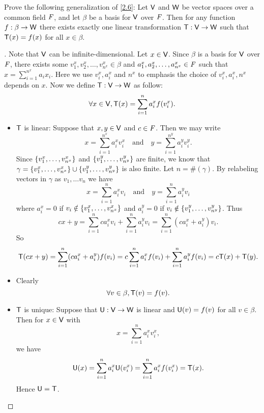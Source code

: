 \begin{ex}\label{ex:2.1.34}
  Prove the following generalization of \cref{2.6}:
  Let \(\mathsf{V}\) and \(\mathsf{W}\) be vector spaces over a common field \(\mathit{F}\), and let \(\beta\) be a basis for \(\mathsf{V}\) over \(\mathit{F}\).
  Then for any function \(f : \beta \to \mathsf{W}\) there exists exactly one linear transformation \(\mathsf{T} : \mathsf{V} \to \mathsf{W}\) such that \(\mathsf{T}(x) = f(x)\) for all \(x \in \beta\).
\end{ex}

\begin{proof}[]
  Note that \(\mathsf{V}\) can be infinite-dimensional.
  Let \(x \in \mathsf{V}\).
  Since \(\beta\) is a basis for \(\mathsf{V}\) over \(\mathit{F}\), there exists some \(v_1^x, v_2^x, \dots, v_{n^x}^x \in \beta\) and \(a_1^x, a_2^x, \dots, a_{n^x}^x \in \mathit{F}\) such that \(x = \sum_{i = 1}^{n^x} a_i x_i\).
  Here we use \(v_i^x, a_i^x\) and \(n^x\) to emphasis the choice of \(v_i^x, a_i^x, n^x\) depends on \(x\).
  Now we define \(\mathsf{T} : \mathsf{V} \to \mathsf{W}\) as follow:
  \[
    \forall x \in \mathsf{V}, \mathsf{T}(x) = \sum_{i = 1}^n a_i^x f(v_i^x).
  \]
  \begin{itemize}
    \item \(\mathsf{T}\) is linear:
          Suppose that \(x, y \in \mathsf{V}\) and \(c \in \mathit{F}\).
          Then we may write
          \[
            x = \sum_{i = 1}^{n^x} a_i^x v_i^x \quad \text{and} \quad y = \sum_{i = 1}^{n^y} a_i^y v_i^y.
          \]
          Since \(\left\lbrace v_1^x, \dots, v_{n^x}^x\right\rbrace\) and \(\left\lbrace v_1^y, \dots, v_{n^y}^y\right\rbrace\) are finite, we know that \(\gamma = \left\lbrace v_1^x, \dots, v_{n^x}^x\right\rbrace \cup \left\lbrace v_1^y, \dots, v_{n^y}^y\right\rbrace\) is also finite.
          Let \(n = \#(\gamma)\).
          By relabeling vectors in \(\gamma\) as \(v_1, \dots v_n\) we have
          \[
            x = \sum_{i = 1}^n a_i^x v_i \quad \text{and} \quad y = \sum_{i = 1}^n a_i^y v_i
          \]
          where \(a_i^x = 0\) if \(v_i \notin \left\lbrace v_1^x, \dots, v_{n^x}^x\right\rbrace\) and \(a_i^y = 0\) if \(v_i \notin \left\lbrace v_1^y, \dots, v_{n^y}^y\right\rbrace\).
          Thus
          \[
            cx + y = \sum_{i = 1}^n c a_i^x v_i + \sum_{i = 1}^n a_i^y v_i = \sum_{i = 1}^n (c a_i^x + a_i^y) v_i.
          \]
          So
          \[
            \mathsf{T}(cx + y) = \sum_{i = 1}^n (c a_i^x + a_i^y) f(v_i) = c \sum_{i = 1}^n a_i^x f(v_i) + \sum_{i = 1}^n a_i^y f(v_i) = c \mathsf{T}(x) + \mathsf{T}(y).
          \]
    \item Clearly
          \[
            \forall v \in \beta, \mathsf{T}(v) = f(v).
          \]
    \item \(\mathsf{T}\) is unique:
          Suppose that \(\mathsf{U} : \mathsf{V} \to \mathsf{W}\) is linear and \(\mathsf{U}(v) = f(v)\) for all \(v \in \beta\).
          Then for \(x \in \mathsf{V}\) with
          \[
            x = \sum_{i = 1}^n a_i^x v_i^x,
          \]
          we have
          \[
            \mathsf{U}(x) = \sum_{i = 1}^n a_i^x \mathsf{U}(v_i^x) = \sum_{i = 1}^n a_i^x f(v_i^x) = \mathsf{T}(x).
          \]
          Hence \(\mathsf{U} = \mathsf{T}\).
  \end{itemize}
\end{proof}

